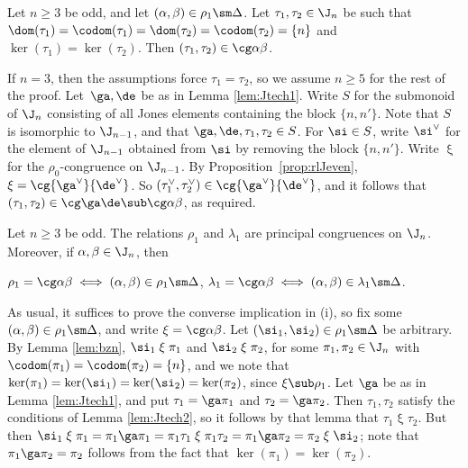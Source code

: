%
\begin{lemma}\label{lem:Jtech2}
Let $n\geq3$ be odd, and let $(\alpha,\beta)\in\rho_1\sm\Delta$.  Let $\tau_1,\tau_2\in\J_n$ be such that $\dom(\tau_1)=\codom(\tau_1)=\dom(\tau_2)=\codom(\tau_2)=\{n\}$ and $\ker(\tau_1)=\ker(\tau_2)$.
Then $(\tau_1,\tau_2)\in\cg\alpha\beta$.
\end{lemma}

\pf If $n=3$, then the assumptions force $\tau_1=\tau_2$, so we assume $n\geq5$ for the rest of the proof.  Let~$\ga,\de$ be as in Lemma \ref{lem:Jtech1}.  Write $S$ for the submonoid of $\J_n$ consisting of all Jones elements containing the block $\{n,n'\}$.  Note that $S$ is isomorphic to $\J_{n-1}$, and that $\ga,\de,\tau_1,\tau_2\in S$.  For $\si\in S$, write $\si^\vee$ for the element of $\J_{n-1}$ obtained from $\si$ by removing the block $\{n,n'\}$.  Write $\mathrel\xi$ for the $\rho_0$-congruence on $\J_{n-1}$.  By Proposition~\ref{prop:rlJeven}, ${\mathrel\xi}=\cg{\ga^\vee}{\de^\vee}$.  So $(\tau_1^\vee,\tau_2^\vee)\in\cg{\ga^\vee}{\de^\vee}$, and it follows that $(\tau_1,\tau_2)\in\cg\ga\de\sub\cg\alpha\beta$, as required. \epf



%
\begin{prop}\label{prop:rlJodd}
Let $n\geq3$ be odd.  The relations $\rho_1$ and $\lambda_1$ are principal congruences on $\J_n$.  Moreover, if $\alpha,\beta\in\J_n$, then
\begin{itemize}\begin{multicols}{2}
 $\rho_1=\cg\alpha\beta\iff (\alpha,\beta)\in\rho_1\sm\Delta$,
 $\lambda_1=\cg\alpha\beta\iff (\alpha,\beta)\in\lambda_1\sm\Delta$.
\end{multicols}\end{itemize}
\end{prop}

\pf As usual, it suffices to prove the converse implication in (i), so fix some $(\alpha,\beta)\in\rho_1\sm\Delta$, and
write ${\mathrel\xi}=\cg\alpha\beta$.  
Let $(\si_1,\si_2)\in\rho_1\sm\Delta$ be arbitrary.  
By Lemma \ref{lem:bzn}, $\si_1\mathrel\xi\pi_1$ and $\si_2\mathrel\xi\pi_2$, for some $\pi_1,\pi_2\in\J_n$ with $\codom(\pi_1)=\codom(\pi_2)=\{n\}$, and we note that $\ker(\pi_1)=\ker(\si_1)=\ker(\si_2)=\ker(\pi_2)$, since ${\mathrel\xi}\sub\rho_1$.  
Let $\ga$ be as in Lemma \ref{lem:Jtech1}, and put $\tau_1=\ga\pi_1$ and $\tau_2=\ga\pi_2$.  Then $\tau_1,\tau_2$ satisfy the conditions of Lemma \ref{lem:Jtech2}, so it follows by that lemma that $\tau_1\mathrel\xi\tau_2$.  But then $\si_1\mathrel\xi\pi_1=\pi_1\ga\pi_1=\pi_1\tau_1\mathrel\xi\pi_1\tau_2=\pi_1\ga\pi_2=\pi_2\mathrel\xi\si_2$; note that $\pi_1\ga\pi_2=\pi_2$ follows from the fact that $\ker(\pi_1)=\ker(\pi_2)$. \epf


